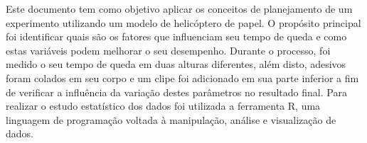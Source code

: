\documentclass[
12pt,					%
openright,				%
twoside,				%
a4paper,				%
english,
brazil
]{ABNT/abntex2_report}
\begin{document}
	\frenchspacing
	\imprimircapa
\ABNTEXchapterfont\large\textbf{\resumoatitlename}
\begin{flushleft}
	\normalsize
	\justify
	\normalfont
		Este documento tem como objetivo aplicar os conceitos de planejamento de um experimento utilizando um modelo de helicóptero de papel. O propósito principal foi identificar quais são os fatores que influenciam seu tempo de queda e como estas variáveis podem melhorar o seu desempenho. Durante o processo, foi medido o seu tempo de queda em duas alturas diferentes, além disto, adesivos foram colados em seu corpo e um clipe foi adicionado em sua parte inferior a fim de verificar a influência da variação destes parâmetros no resultado final. Para realizar o estudo estatístico dos dados foi utilizada a ferramenta R, uma linguagem de programação voltada à manipulação, análise e visualização de dados.		
	
\end{flushleft}
\vspace*{1cm}
\newpage

\begin{flushleft}
	\ABNTEXchapterfont\Large\textbf{\MakeUppercase\listadesimbolsabrevtitlename}
		\noindent
		\vspace*{-06pt}
		\normalsize
		\normalfont
		\aclist[list=acronyms]
	\end{flushleft}
	\newpage
\end{document}
